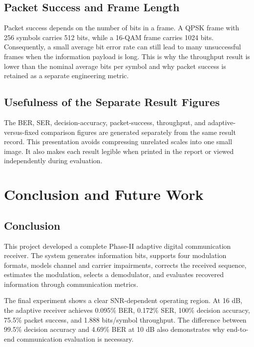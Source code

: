 \documentclass[12pt,twoside,openright]{report}
\begin{document}
\section{Packet Success and Frame Length}
Packet success depends on the number of bits in a frame. A QPSK frame with
256 symbols carries 512 bits, while a 16-QAM frame carries 1024 bits.
Consequently, a small average bit error rate can still lead to many
unsuccessful frames when the information payload is long. This is why the
throughput result is lower than the nominal average bits per symbol and why
packet success is retained as a separate engineering metric.

\section{Usefulness of the Separate Result Figures}
The BER, SER, decision-accuracy, packet-success, throughput, and
adaptive-versus-fixed comparison figures are generated separately from the
same result record. This presentation avoids compressing unrelated scales
into one small image. It also makes each result legible when printed in the
report or viewed independently during evaluation.

\chapter{Conclusion and Future Work}

\section{Conclusion}
This project developed a complete Phase-II adaptive digital communication
receiver. The system generates information bits, supports four modulation
formats, models channel and carrier impairments, corrects the received
sequence, estimates the modulation, selects a demodulator, and evaluates
recovered information through communication metrics.

The final experiment shows a clear SNR-dependent operating region. At
16 dB, the adaptive receiver achieves 0.095\% BER, 0.172\% SER, 100\%
decision accuracy, 75.5\% packet success, and 1.888 bits/symbol throughput.
The difference between 99.5\% decision accuracy and 4.69\% BER at 10 dB
also demonstrates why end-to-end communication evaluation is necessary.
\end{document}

